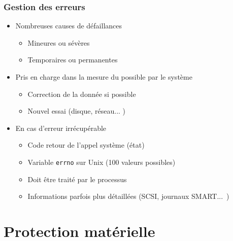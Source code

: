\begin{frame}
\frametitle{Gestion des erreurs}
\begin{itemize}
\item Nombreuses causes de défaillances
\begin{itemize}
\item Mineures ou sévères
\item Temporaires ou permanentes
\end{itemize}
\item Pris en charge dans la mesure du possible par le système
\begin{itemize}
\item Correction de la donnée si possible
\item Nouvel essai (disque, réseau... )
\end{itemize}
\item En cas d'erreur irrécupérable
\begin{itemize}
\item Code retour de l'appel système (état)
\item Variable \texttt{errno} sur Unix (100 valeurs possibles)
\item Doit être traité par le processus
\item Informations parfois plus détaillées (SCSI, journaux SMART...~)
\end{itemize}
\end{itemize}
\end{frame}


\section{Protection matérielle}

